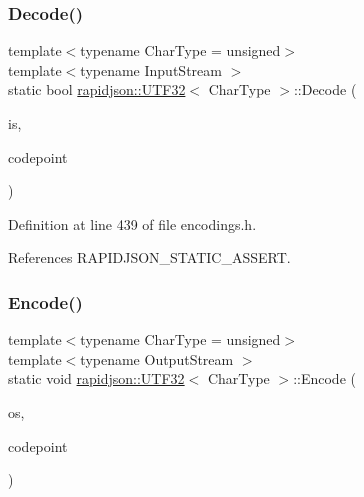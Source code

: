 \subsubsection{\texorpdfstring{Decode()}{Decode()}}
{\footnotesize\ttfamily template$<$typename Char\+Type  = unsigned$>$ \\
template$<$typename Input\+Stream $>$ \\
static bool \mbox{\hyperlink{structrapidjson_1_1_u_t_f32}{rapidjson\+::\+U\+T\+F32}}$<$ Char\+Type $>$\+::Decode (\begin{DoxyParamCaption}\item[{Input\+Stream \&}]{is,  }\item[{unsigned $\ast$}]{codepoint }\end{DoxyParamCaption})\hspace{0.3cm}{\ttfamily [static]}}



Definition at line 439 of file encodings.\+h.


\begin{DoxyCode}{0}

\end{DoxyCode}


References R\+A\+P\+I\+D\+J\+S\+O\+N\+\_\+\+S\+T\+A\+T\+I\+C\+\_\+\+A\+S\+S\+E\+RT.

\mbox{\label{structrapidjson_1_1_u_t_f32_a3b0052772242f79904a11c1fd69ba7a8}} 
\subsubsection{\texorpdfstring{Encode()}{Encode()}}
{\footnotesize\ttfamily template$<$typename Char\+Type  = unsigned$>$ \\
template$<$typename Output\+Stream $>$ \\
static void \mbox{\hyperlink{structrapidjson_1_1_u_t_f32}{rapidjson\+::\+U\+T\+F32}}$<$ Char\+Type $>$\+::Encode (\begin{DoxyParamCaption}\item[{Output\+Stream \&}]{os,  }\item[{unsigned}]{codepoint }\end{DoxyParamCaption})\hspace{0.3cm}{\ttfamily [static]}}



